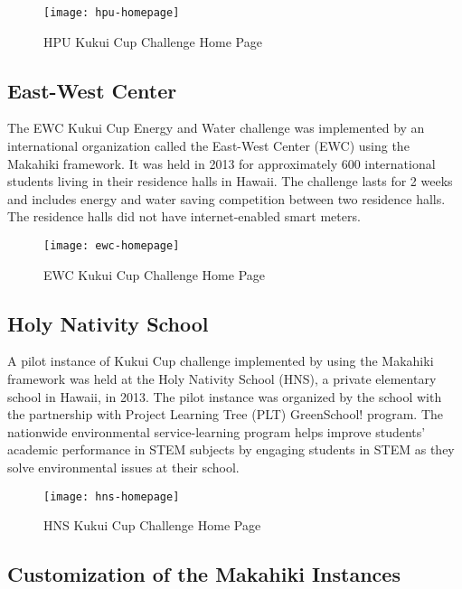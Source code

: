 \begin{figure}[ht!]
   \centering
   \texttt{[image: hpu-homepage]}
   \caption{HPU Kukui Cup Challenge Home Page}
   \label{fig:hpu-homepage}
\end{figure}

\subsection{East-West Center}

The EWC Kukui Cup Energy and Water challenge was implemented by an international organization called the East-West Center (EWC) using the Makahiki framework. It was held in 2013 for approximately 600 international students living in their residence halls in Hawaii. The challenge lasts for 2 weeks and includes energy and water saving competition between two residence halls. The residence halls did not have internet-enabled smart meters.

\begin{figure}[ht!]
   \centering
   \texttt{[image: ewc-homepage]}
   \caption{EWC Kukui Cup Challenge Home Page}
   \label{fig:ewc-homepage}
\end{figure}

\subsection{Holy Nativity School}

A pilot instance of Kukui Cup challenge implemented by using the Makahiki framework was held at the Holy Nativity School (HNS), a private elementary school in Hawaii, in 2013. The pilot instance was organized by the school with the partnership with Project Learning Tree (PLT) GreenSchool! program\cite{plt-greenschools}. The nationwide environmental service-learning program helps improve students’ academic performance in STEM subjects by engaging students in STEM as they solve environmental issues at their school.

\begin{figure}[ht!]
   \centering
   \texttt{[image: hns-homepage]}
   \caption{HNS Kukui Cup Challenge Home Page}
   \label{fig:hns-homepage}
\end{figure}

\subsection{Customization of the Makahiki Instances}

